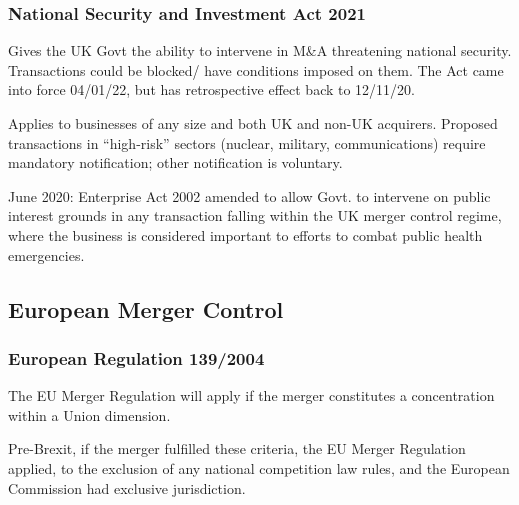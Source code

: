 \documentclass[
]{article}
\newenvironment{Shaded}{}{}
\newcommand{\NormalTok}[1]{#1}
\begin{document}
\hypertarget{national-security-and-investment-act-2021}{%
\subsubsection{National Security and Investment Act
2021}\label{national-security-and-investment-act-2021}}

Gives the UK Govt the ability to intervene in M\&A threatening national
security. Transactions could be blocked/ have conditions imposed on
them. The Act came into force 04/01/22, but has retrospective effect
back to 12/11/20.

Applies to businesses of any size and both UK and non-UK acquirers.
Proposed transactions in ``high-risk'' sectors (nuclear, military,
communications) require mandatory notification; other notification is
voluntary.

\begin{Shaded}
\begin{Highlighting}[]
\NormalTok{June 2020: Enterprise Act 2002 amended to allow Govt. to intervene on public interest grounds in any transaction falling within the UK merger control regime, where the business is considered important to efforts to combat public health emergencies. }
\end{Highlighting}
\end{Shaded}

\hypertarget{european-merger-control}{%
\subsection{European Merger Control}\label{european-merger-control}}

\hypertarget{european-regulation-1392004}{%
\subsubsection{European Regulation
139/2004}\label{european-regulation-1392004}}

\begin{Shaded}
\begin{Highlighting}[]
\NormalTok{The EU Merger Regulation will apply if the merger constitutes a concentration within a Union dimension. }
\end{Highlighting}
\end{Shaded}

Pre-Brexit, if the merger fulfilled these criteria, the EU Merger
Regulation applied, to the exclusion of any national competition law
rules, and the European Commission had exclusive jurisdiction.
\end{document}
